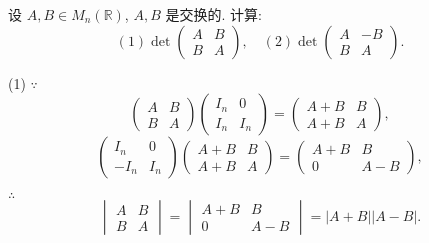 \documentclass{ctexart}
\begin{document}
\begin{exercisec}%
    设 $A,B\in M_n(\mathbb{R})$, $A,B$ 是交换的. 计算:
    \[(1)\det\begin{pmatrix}
        A & B \\
        B & A
    \end{pmatrix},\quad(2)\det\begin{pmatrix}
        A & -B \\
        B & A
    \end{pmatrix}.\]
\end{exercisec}
\begin{solution}
    (1) $\because$
    \[\begin{pmatrix}
        A & B \\
        B & A
    \end{pmatrix}\begin{pmatrix}
        I_n & 0 \\
        I_n & I_n
    \end{pmatrix}=\begin{pmatrix}
        A+B & B \\
        A+B & A
    \end{pmatrix},\]
    \[\begin{pmatrix}
        I_n & 0 \\
        -I_n & I_n
    \end{pmatrix}\begin{pmatrix}
        A+B & B \\
        A+B & A
    \end{pmatrix}=\begin{pmatrix}
        A+B & B \\
        0 & A-B
    \end{pmatrix},\]

    $\therefore$
    \[\begin{vmatrix}
        A & B \\
        B & A
    \end{vmatrix}=\begin{vmatrix}
        A+B & B \\
        0 & A-B
    \end{vmatrix}=|A+B||A-B|.\]


\end{solution}
\end{document}
